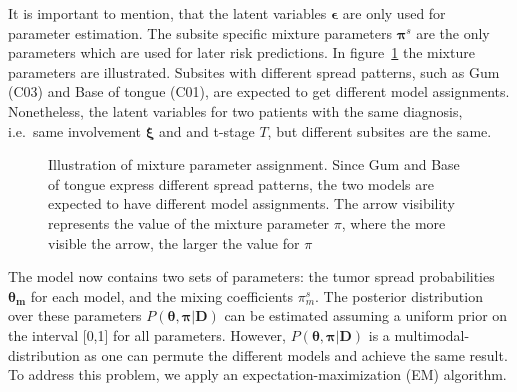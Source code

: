 \documentclass[
  sn-mathphys-num,
]{sn-jnl}
\begin{document}
It is important to mention, that the latent variables
\(\boldsymbol{\epsilon}\) are only used for parameter estimation. The
subsite specific mixture parameters \(\boldsymbol{\pi}^s\) are the only
parameters which are used for later risk predictions. In
figure~\ref{fig-model-simple} the mixture parameters are illustrated.
Subsites with different spread patterns, such as Gum (C03) and Base of
tongue (C01), are expected to get different model assignments.
Nonetheless, the latent variables for two patients with the same
diagnosis, i.e.~same involvement \(\boldsymbol{\xi}\) and and t-stage
\(T\), but different subsites are the same.

\begin{figure}


\caption{\label{fig-model-simple}Illustration of mixture parameter
assignment. Since Gum and Base of tongue express different spread
patterns, the two models are expected to have different model
assignments. The arrow visibility represents the value of the mixture
parameter \(\pi\), where the more visible the arrow, the larger the
value for \(\pi\)}

\end{figure}%

The model now contains two sets of parameters: the tumor spread
probabilities \(\mathbf{\theta_m}\) for each model, and the mixing
coefficients \(\pi_m^s\). The posterior distribution over these
parameters \(P(\boldsymbol{\theta},\boldsymbol{\pi}|\mathbf{D})\) can be
estimated assuming a uniform prior on the interval {[}0,1{]} for all
parameters. However,
\(P(\boldsymbol{\theta},\boldsymbol{\pi}|\mathbf{D})\) is a
multimodal-distribution as one can permute the different models and
achieve the same result. To address this problem, we apply an
expectation-maximization (EM) algorithm.
\end{document}
